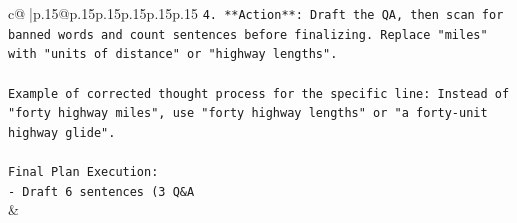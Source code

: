 \documentclass{article}
\begin{document}
{\begin{supertabular}{c@{$\;$}|p{.15\linewidth}@{}p{.15\linewidth}p{.15\linewidth}p{.15\linewidth}p{.15\linewidth}p{.15\linewidth}}
{{{\texttt{4.  **Action**: Draft the QA, then scan for banned words and count sentences before finalizing. Replace "miles" with "units of distance" or "highway lengths".} \\
\\ 
\texttt{Example of corrected thought process for the specific line: Instead of "forty highway miles", use "forty highway lengths" or "a forty{-}unit highway glide".} \\
\\ 
\texttt{Final Plan Execution:} \\
\texttt{{-}   Draft 6 sentences (3 Q\&A} \\
            }
        }
    }
    & \\ \\

\end{supertabular}
}
\end{document}
